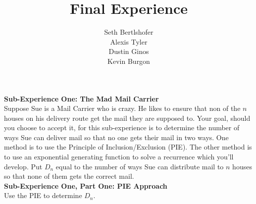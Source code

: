 \documentclass[10pt,a4paper]{report}
\author{Seth Bertlshofer\\Alexis Tyler\\Dustin Ginos\\Kevin Burgon}
\title{Final Experience}
\begin{document}
	\maketitle
	\textbf{Sub-Experience One: The Mad Mail Carrier}\\
	Suppose Sue is a Mail Carrier who is crazy.  He likes to ensure that non of the $n$ houses on his delivery route get the mail they are supposed to.  Your goal, should you choose to accept it, for this sub-experience is to determine the number of ways Sue can deliver mail so that no one gets their mail in two ways.  One method is to use the Principle of Inclusion/Exclusion (PIE).  The other method is to use an exponential generating function to solve a recurrence which you'll develop.  Put $D_n$ equal to the number of ways Sue can distribute mail to $n$ houses so that none of them gets the correct mail.\\
	
	\textbf{Sub-Experience One, Part One: PIE Approach}\\
	Use the PIE to determine $D_n$.\\
	
\end{document}
